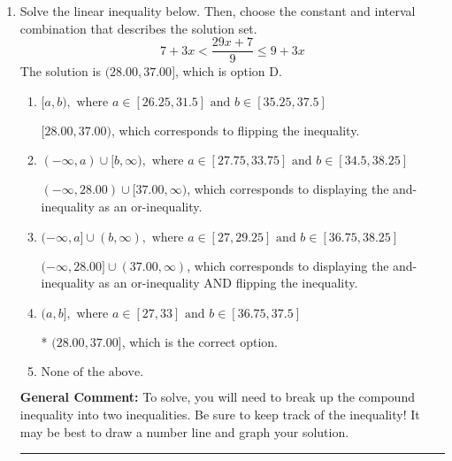 \documentclass{extbook}[14pt]
\newcommand{\litem}[1]{\item #1

\rule{\textwidth}{0.4pt}}
\begin{document}
\begin{enumerate}
{\begin{enumerate}[label=\Alph*.]
Corresponds to inverting the inequality and negating the solution.
\item \( (-\infty, a) \cup (b, \infty), \text{ where } a \in [-2.25, 3] \text{ and } b \in [0.75, 4.5] \)

 * Correct option.
\item \( (-\infty, a] \cup [b, \infty), \text{ where } a \in [-4.5, 0.75] \text{ and } b \in [-3, 2.25] \)

Corresponds to including the endpoints AND negating.
\item \( (-\infty, a] \cup [b, \infty), \text{ where } a \in [0, 5.25] \text{ and } b \in [2.25, 8.25] \)

Corresponds to including the endpoints (when they should be excluded).
\item \( (-\infty, \infty) \)

Corresponds to the variable canceling, which does not happen in this instance.
\end{enumerate}

\textbf{General Comment:} When multiplying or dividing by a negative, flip the sign.
}
\litem{
Solve the linear inequality below. Then, choose the constant and interval combination that describes the solution set.
\[ 7 + 3 x < \frac{29 x + 7}{9} \leq 9 + 3 x \]The solution is \( (28.00, 37.00] \), which is option D.\begin{enumerate}[label=\Alph*.]
\item \( [a, b), \text{ where } a \in [26.25, 31.5] \text{ and } b \in [35.25, 37.5] \)

$[28.00, 37.00)$, which corresponds to flipping the inequality.
\item \( (-\infty, a) \cup [b, \infty), \text{ where } a \in [27.75, 33.75] \text{ and } b \in [34.5, 38.25] \)

$(-\infty, 28.00) \cup [37.00, \infty)$, which corresponds to displaying the and-inequality as an or-inequality.
\item \( (-\infty, a] \cup (b, \infty), \text{ where } a \in [27, 29.25] \text{ and } b \in [36.75, 38.25] \)

$(-\infty, 28.00] \cup (37.00, \infty)$, which corresponds to displaying the and-inequality as an or-inequality AND flipping the inequality.
\item \( (a, b], \text{ where } a \in [27, 33] \text{ and } b \in [36.75, 37.5] \)

* $(28.00, 37.00]$, which is the correct option.
\item \( \text{None of the above.} \)


\end{enumerate}

\textbf{General Comment:} To solve, you will need to break up the compound inequality into two inequalities. Be sure to keep track of the inequality! It may be best to draw a number line and graph your solution.
}
\end{enumerate}
\end{document}
